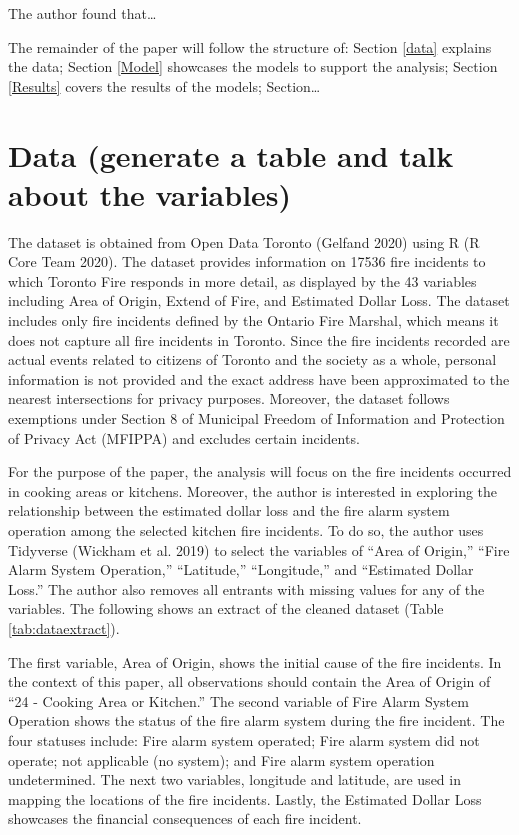 \documentclass[
]{article}
\begin{document}
The author found that\ldots{}

The remainder of the paper will follow the structure of: Section \ref{data} explains the data; Section \ref{Model} showcases the models to support the analysis; Section \ref{Results} covers the results of the models; Section\ldots{}

\hypertarget{data-generate-a-table-and-talk-about-the-variables}{%
\section{Data (generate a table and talk about the variables)}\label{data-generate-a-table-and-talk-about-the-variables}}

The dataset is obtained from Open Data Toronto (Gelfand 2020) using R (R Core Team 2020). The dataset provides information on 17536 fire incidents to which Toronto Fire responds in more detail, as displayed by the 43 variables including Area of Origin, Extend of Fire, and Estimated Dollar Loss. The dataset includes only fire incidents defined by the Ontario Fire Marshal, which means it does not capture all fire incidents in Toronto. Since the fire incidents recorded are actual events related to citizens of Toronto and the society as a whole, personal information is not provided and the exact address have been approximated to the nearest intersections for privacy purposes. Moreover, the dataset follows exemptions under Section 8 of Municipal Freedom of Information and Protection of Privacy Act (MFIPPA) and excludes certain incidents.

For the purpose of the paper, the analysis will focus on the fire incidents occurred in cooking areas or kitchens. Moreover, the author is interested in exploring the relationship between the estimated dollar loss and the fire alarm system operation among the selected kitchen fire incidents. To do so, the author uses Tidyverse (Wickham et al. 2019) to select the variables of ``Area of Origin,'' ``Fire Alarm System Operation,'' ``Latitude,'' ``Longitude,'' and ``Estimated Dollar Loss.'' The author also removes all entrants with missing values for any of the variables. The following shows an extract of the cleaned dataset (Table \ref{tab:dataextract}).

The first variable, Area of Origin, shows the initial cause of the fire incidents. In the context of this paper, all observations should contain the Area of Origin of ``24 - Cooking Area or Kitchen.'' The second variable of Fire Alarm System Operation shows the status of the fire alarm system during the fire incident. The four statuses include: Fire alarm system operated; Fire alarm system did not operate; not applicable (no system); and Fire alarm system operation undetermined. The next two variables, longitude and latitude, are used in mapping the locations of the fire incidents. Lastly, the Estimated Dollar Loss showcases the financial consequences of each fire incident.
\end{document}
